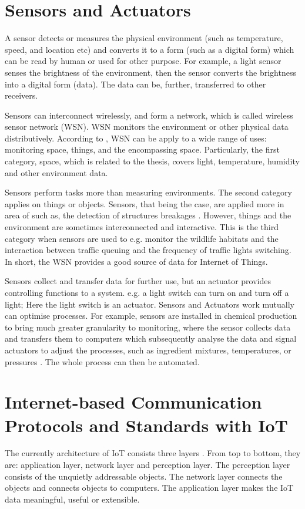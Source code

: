 \section{Sensors and Actuators}
A sensor detects or measures the physical environment (such as temperature, speed, and location etc) and converts it to a form (such as a digital form) which can be read by human or used for other purpose. For example, a light sensor senses the brightness of the environment, then the sensor converts the brightness into a digital form (data). The data can be, further, transferred to other receivers.

Sensors can interconnect wirelessly, and form a network, which is called wireless sensor network (WSN). WSN monitors the environment or other physical data distributively. According to \cite{culler2004guest}, WSN can be apply to a wide range of uses: monitoring space, things, and the encompassing space. Particularly, the first category, space, which is related to the thesis, covers light, temperature, humidity and other environment data. 

Sensors perform tasks more than measuring environments. The second category applies on things or objects. Sensors, that being the case, are applied more in area of such as, the detection of structures breakages \cite{christin2009wireless}. However, things and the environment are sometimes interconnected and interactive. This is the third category when sensors are used to e.g. monitor the wildlife habitats \cite{culler2004guest} and the interaction between traffic queuing and the frequency of traffic lights switching. In short, the WSN provides a good source of data for Internet of Things.

Sensors collect and transfer data for further use, but an actuator provides controlling functions to a system. e.g. a light switch can turn on and turn off a light; Here the light switch is an actuator. Sensors and Actuators work mutually can optimise processes. For example, sensors are installed in chemical production to bring much greater granularity to monitoring, where the sensor collects data and transfers them to computers which subsequently analyse the data and signal actuators to adjust the processes, such as ingredient mixtures, temperatures, or pressures \cite{chui2010internet}. The whole process can then be automated. 

\section{Internet-based Communication Protocols and Standards with IoT}
The currently architecture of IoT consists three layers \cite{wu2010research}. From top to bottom, they are: application layer, network layer and perception layer. The perception layer consists of the unquietly addressable objects. The network layer connects the objects and connects objects to computers. The application layer makes the IoT data meaningful, useful or extensible.

